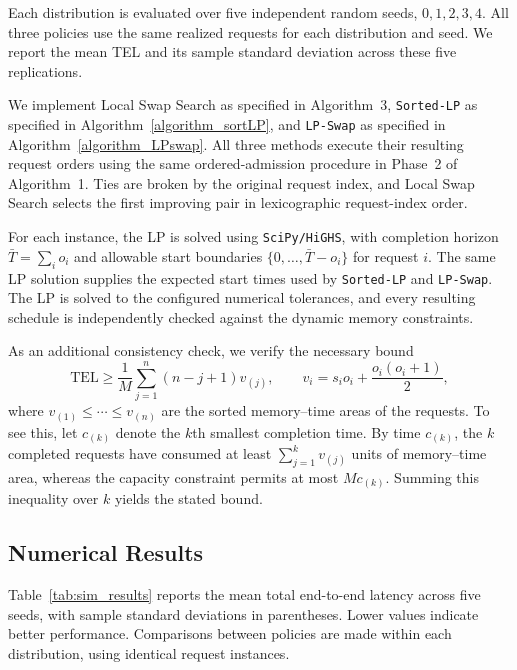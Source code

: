 \documentclass[nonblindrev]{informs3_hide}
\newcommand{\xhdr}[1]{\vspace{1mm} \noindent{\bf #1}}
\newcommand{\sortLP}{\texttt{Sorted-LP}}
\newcommand{\LPSwap}{\texttt{LP-Swap}}
\begin{document}
Each distribution is evaluated over five independent random seeds,
$0,1,2,3,4$. All three policies use the same realized requests
for each distribution and seed. We report the mean TEL and its
sample standard deviation across these five replications.

\xhdr{Algorithm implementation.}
We implement Local Swap Search as specified in Algorithm~3,
\sortLP{} as specified in Algorithm~\ref{algorithm_sortLP},
and \LPSwap{} as specified in Algorithm~\ref{algorithm_LPswap}.
All three methods execute their resulting request orders using
the same ordered-admission procedure in Phase~2 of Algorithm~1.
Ties are broken by the original request index, and Local Swap
Search selects the first improving pair in lexicographic
request-index order.

For each instance, the LP is solved using \texttt{SciPy/HiGHS},
with completion horizon $\bar T=\sum_i o_i$ and allowable start
boundaries $\{0,\ldots,\bar T-o_i\}$ for request $i$.
The same LP solution supplies the expected start times used by
\sortLP{} and \LPSwap{}. The LP is solved to the configured
numerical tolerances, and every resulting schedule is independently
checked against the dynamic memory constraints.

As an additional consistency check, we verify the necessary bound
\[
\mathrm{TEL}\ge
\frac{1}{M}\sum_{j=1}^{n}(n-j+1)v_{(j)},
\qquad
v_i=s_io_i+\frac{o_i(o_i+1)}{2},
\]
where $v_{(1)}\le\cdots\le v_{(n)}$ are the sorted
memory--time areas of the requests.
To see this, let $c_{(k)}$ denote the $k$th smallest completion
time. By time $c_{(k)}$, the $k$ completed requests have consumed
at least $\sum_{j=1}^{k}v_{(j)}$ units of memory--time area,
whereas the capacity constraint permits at most $Mc_{(k)}$.
Summing this inequality over $k$ yields the stated bound.

\subsection*{Numerical Results}

Table~\ref{tab:sim_results} reports the mean total end-to-end
latency across five seeds, with sample standard deviations in
parentheses. Lower values indicate better performance.
Comparisons between policies are made within each distribution,
using identical request instances.
\end{document}
